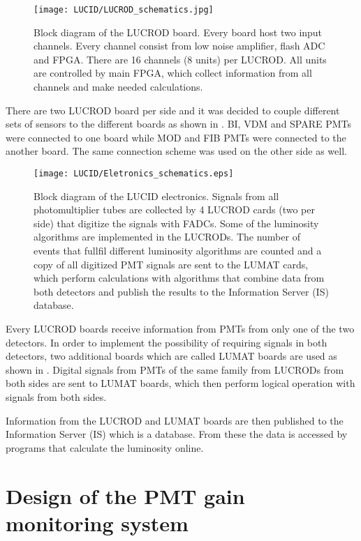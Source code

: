 \begin{figure}
\centering
\texttt{[image: LUCID/LUCROD\_schematics.jpg]}
\caption{Block diagram of the LUCROD board. Every board host two input channels. Every channel consist from low noise amplifier, flash ADC and FPGA. 
There are 16 channels (8 units) per LUCROD. All units are controlled by main FPGA, which collect information from all channels and make needed calculations.}
\label{fig:LUCROD_schematics}
\end{figure}

There are two LUCROD board per side and it was decided to couple different sets of sensors to the different boards as shown in 
.
BI, VDM and SPARE PMTs were connected to one board while MOD and FIB PMTs were connected to the another board.
The same connection scheme was used on the other side as well.

\begin{figure}
\centering
\texttt{[image: LUCID/Eletronics\_schematics.eps]}
\caption{Block diagram of the LUCID electronics. Signals from all photomultiplier tubes are collected by 4 \mbox{LUCROD} cards 
(two per side) that digitize the signals with FADCs. Some of the luminosity algorithms are implemented in the LUCRODs. 
The number of events that fullfil different luminosity algorithms are counted and a copy of all digitized PMT 
signals are sent to the LUMAT cards, which perform calculations with algorithms that combine data from 
both detectors and publish the results to the Information Server (IS) database.}
\label{fig:Eletronics_schematics}
\end{figure}

Every LUCROD boards receive information from PMTs from only one of the two detectors.
In order to implement the possibility of requiring signals in both detectors, two additional boards which are called LUMAT boards are used
as shown in .
Digital signals from PMTs of the same family from LUCRODs from both sides are sent to LUMAT boards, 
which then perform logical operation with signals from both sides.

Information from the LUCROD and LUMAT boards are then published to the Information Server (IS) which is a database.
From these the data is accessed by programs that calculate the luminosity online.

\section{Design of the PMT gain monitoring system}
\label{sec:pmtGainMonitoringSystem}

